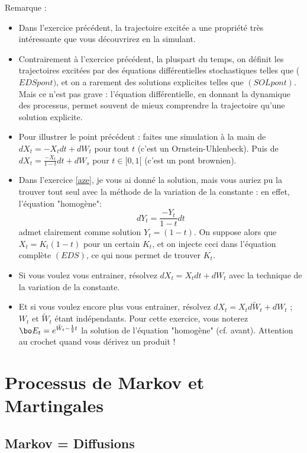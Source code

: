 \documentclass{article}
\begin{document}
Remarque : 
\begin{itemize}
\item Dans l'exercice précédent, la trajectoire excitée a une propriété très intéressante que vous découvrirez en la simulant. 
\item  Contrairement à l'exercice précédent, la pluspart du temps, on définit   les trajectoires excitées  par des équations différentielles stochastiques telles que ($EDSpont)$,  et on a rarement des solutions explicites telles que   ${(SOLpont)}$. Mais ce n'est pas grave :   l'équation différentielle, en donnant la dynamique des processus, permet souvent de mieux  comprendre la trajectoire qu'une solution explicite. 
\item Pour illustrer le point précédent : faites une simulation à la main  de $dX_t = -X_t dt + dW_t$ pour tout $t$ (c'est un Ornstein-Uhlenbeck). Puis de   $dX_t= \frac {-X_t}{1-t}dt + dW_s$ pour $t\in [0,1[$ (c'est un pont brownien).
\item Dans l'exercice \ref{aze}, je vous ai donné la solution, mais vous auriez pu la trouver tout seul avec la méthode de la variation de la constante : en effet, l'équation "homogène": 
$$
dY_t= \frac {-Y_t}{1-t} dt
$$
admet clairement comme solution $Y_t =(1-t)$. On suppose alors que $X_t= K_t (1-t )$ pour un certain $K_t$, et on injecte ceci dans l'équation complète $(EDS)$, ce qui nous permet  de trouver $K_t$.  
\item Si vous voulez vous entrainer, résolvez $dX_t = X_t dt +  dW_t$ avec la technique de la variation de la constante.  
\item Et si vous voulez encore plus vous entrainer, résolvez $dX_t = X_t d\tilde W_t +  dW_t$ ; $W_t$ et $\tilde W_t$ étant indépendants.  Pour cette exercice, vous noterez $\bo E_t = e^{\tilde W_t -\frac 12 t }$  la solution de l'équation "homogène" (cf. avant). Attention au crochet quand vous dérivez un produit ! 
 \end{itemize}
 
 




\section{Processus de Markov et Martingales}

\subsection{Markov = Diffusions}
\end{document}
